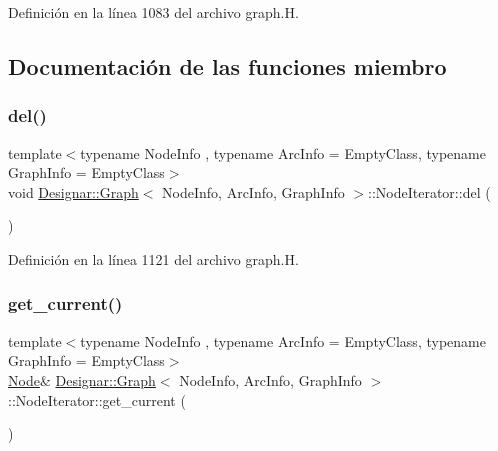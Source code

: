 Definición en la línea 1083 del archivo graph.\+H.



\subsection{Documentación de las funciones miembro}
\mbox{\label{class_designar_1_1_graph_1_1_node_iterator_a8ff7d2de6b10d3fd60774db675340259}} 
\subsubsection{\texorpdfstring{del()}{del()}}
{\footnotesize\ttfamily template$<$typename Node\+Info , typename Arc\+Info  = Empty\+Class, typename Graph\+Info  = Empty\+Class$>$ \\
void \hyperlink{class_designar_1_1_graph}{Designar\+::\+Graph}$<$ Node\+Info, Arc\+Info, Graph\+Info $>$\+::Node\+Iterator\+::del (\begin{DoxyParamCaption}{ }\end{DoxyParamCaption})\hspace{0.3cm}{\ttfamily [inline]}}



Definición en la línea 1121 del archivo graph.\+H.

\mbox{\label{class_designar_1_1_graph_1_1_node_iterator_a79268477058bf2d213dc11581c12a125}} 
\subsubsection{\texorpdfstring{get\+\_\+current()}{get\_current()}\hspace{0.1cm}{\footnotesize\ttfamily [1/2]}}
{\footnotesize\ttfamily template$<$typename Node\+Info , typename Arc\+Info  = Empty\+Class, typename Graph\+Info  = Empty\+Class$>$ \\
\hyperlink{class_designar_1_1_graph_a5dfc7dba9d092ac489c72e40390c37d0}{Node}\& \hyperlink{class_designar_1_1_graph}{Designar\+::\+Graph}$<$ Node\+Info, Arc\+Info, Graph\+Info $>$\+::Node\+Iterator\+::get\+\_\+current (\begin{DoxyParamCaption}{ }\end{DoxyParamCaption})\hspace{0.3cm}{\ttfamily [inline]}}



